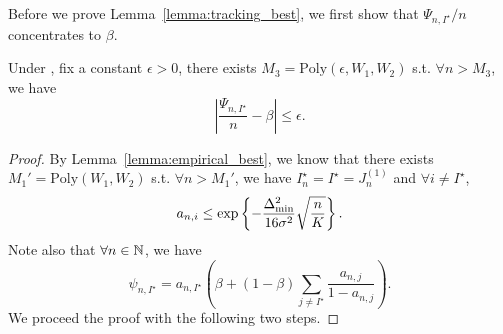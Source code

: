 Before we prove Lemma~\ref{lemma:tracking_best}, we first show that $\Psi_{n,I^\star}/n$ concentrates to $\beta$.

\begin{lemma}\label{lemma:psi_best}
    Under \TTTS, fix a constant $\epsilon>0$, there exists $M_3 = \text{Poly}(\epsilon,W_1,W_2)$ s.t. $\forall n > M_3$, we have
    \[
        \left| \frac{\Psi_{n,I^\star}}{n}-\beta \right| \leq \epsilon.
    \]
\end{lemma}

\begin{proof}
    By Lemma~\ref{lemma:empirical_best}, we know that there exists $M_1' = \text{Poly}(W_1,W_2)$ s.t. $\forall n > M_1'$, we have $I_n^\star = I^\star = J_n^{(1)}$ and $\forall i \neq I^\star$,
    \[
        a_{n,i} \leq \exp\left\{-\frac{\Delta_{\text{min}}^2}{16\sigma^2}\sqrt{\frac{n}{K}}\right\}.
    \]
    Note also that $\forall n\in{\mathbb N}$, we have
    \[
        \psi_{n,I^\star} = a_{n,I^\star} \left(\beta + (1-\beta) \sum_{j\neq I^\star} \frac{a_{n,j}}{1-a_{n,j}}\right).
    \]
    We proceed the proof with the following two steps.
    

\end{proof}
